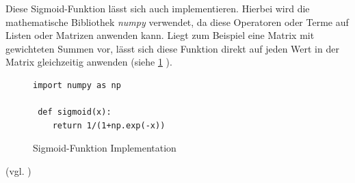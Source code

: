 \documentclass[parskip=half,titlepage]{scrartcl}
\begin{document}
Diese Sigmoid-Funktion lässt sich auch implementieren. Hierbei wird die mathematische Bibliothek \textit{numpy} verwendet, da diese Operatoren oder Terme auf Listen oder Matrizen anwenden kann. Liegt zum Beispiel eine Matrix mit gewichteten Summen vor, lässt sich diese Funktion direkt auf jeden Wert in der Matrix gleichzeitig anwenden (siehe \cref{fig:sigmoid_implementation} ).

\begin{figure}[h]
\begin{lstlisting}
import numpy as np

 def sigmoid(x):
    return 1/(1+np.exp(-x))
\end{lstlisting}
\caption{Sigmoid-Funktion Implementation}
\label{fig:sigmoid_implementation}
\end{figure}


(vgl. \cite[30-32]{Steinwendner2019} )
\end{document}
